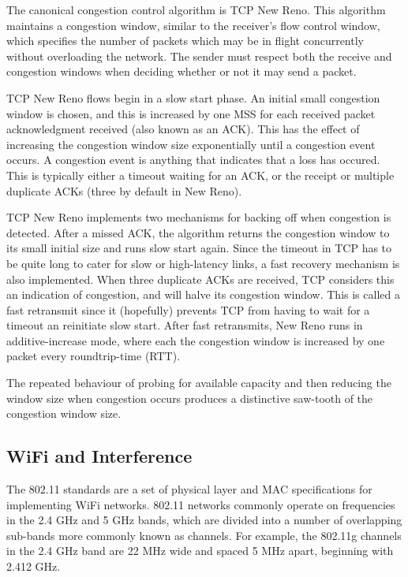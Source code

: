 The canonical congestion control algorithm is TCP New Reno. This algorithm
maintains a congestion window, similar to the receiver's flow control window,
which specifies the number of packets which may be in flight concurrently
without overloading the network. The sender must respect both the receive and
congestion windows when deciding whether or not it may send a packet.

TCP New Reno flows begin in a slow start phase. An initial small congestion
window is chosen, and this is increased by one MSS for each received packet
acknowledgment received (also known as an ACK). This has the effect of
increasing the congestion window size exponentially until a congestion event
occurs. A congestion event is anything that indicates that a loss has occured.
This is typically either a timeout waiting for an ACK, or the receipt or
multiple duplicate ACKs (three by default in New Reno).

TCP New Reno implements two mechanisms for backing off when congestion is
detected. After a missed ACK, the algorithm returns the congestion window to its
small initial size and runs slow start again. Since the timeout in TCP has to be
quite long to cater for slow or high-latency links, a fast recovery mechanism is
also implemented. When three duplicate ACKs are received, TCP considers this an
indication of congestion, and will halve its congestion window. This is called a
fast retransmit since it (hopefully) prevents TCP from having to wait for a
timeout an reinitiate slow start. After fast retransmits, New Reno runs in
additive-increase mode, where each the congestion window is increased by one
packet every roundtrip-time (RTT).

The repeated behaviour of probing for available capacity and then reducing the
window size when congestion occurs produces a distinctive saw-tooth of the
congestion window size.

\subsection{WiFi and Interference}
\label{sec:bg:wifi}
The 802.11 standards are a set of physical layer and MAC specifications for
implementing WiFi networks. 802.11 networks commonly operate on frequencies in
the 2.4 GHz and 5 GHz bands, which are divided into a number of overlapping
sub-bands more commonly known as channels. For example, the 802.11g channels in
the 2.4 GHz band are 22 MHz wide and spaced 5 MHz apart, beginning with 2.412
GHz.

